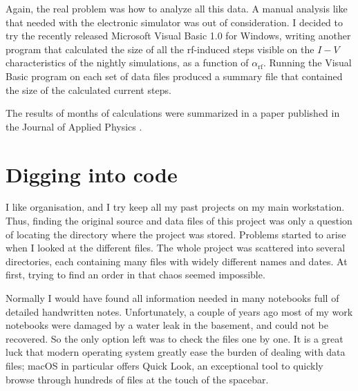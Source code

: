 Again, the real problem was how to analyze all this data. A manual analysis like that needed with the electronic simulator was out of consideration. 
I decided to try the recently released Microsoft Visual Basic 1.0 for Windows, writing another program that calculated the size of all the rf-induced steps visible on the $I-V$ characteristics of the nightly simulations, as a function of $\alpha_\mathrm{rf}$.
Running the Visual Basic program on each set of data files produced a summary file that contained the size of the calculated current steps.

The results of months of calculations were summarized in a paper published in the Journal of Applied Physics \cite{Maggi:1996}.



\section{Digging into code} \label{sec:digging-into-code}

I like organisation, and I try keep all my past projects on my main workstation. 
Thus, finding the original source and data files of this project was only a question of locating the directory where the project was stored.
Problems started to arise when I looked at the different files. The whole project was scattered into several directories, each containing many files with widely different names and dates. At first, trying to find an order in that chaos seemed impossible.

Normally I would have found all information needed in many notebooks full of detailed handwritten notes.
Unfortunately, a couple of years ago most of my work notebooks were damaged by a water leak in the basement, and could not be recovered. So the only option left was to check the files one by one. 
It is a great luck that modern operating system greatly ease the burden of dealing with data files; macOS in particular offers Quick Look, an exceptional tool to quickly browse through hundreds of files at the touch of the spacebar.


